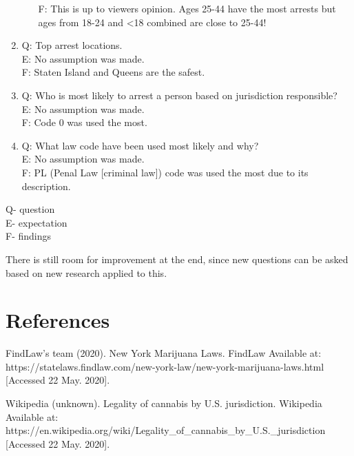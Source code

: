 \documentclass{article}\usepackage[]{graphicx}\usepackage[]{color}
\begin{document}
\begin{enumerate}
\begin{enumerate}
              F: This is up to viewers opinion. Ages 25-44 have the most arrests but ages from 18-24 and                <18 combined are close to 25-44! 
          \end{enumerate}
        \item
          Q:  Top arrest locations.\\
          E: No assumption was made.\\
          F: Staten Island and Queens are the safest.
        \item
          Q: Who is most likely to arrest a person based on jurisdiction responsible?\\
          E: No assumption was made.\\
          F: Code 0 was used the most.
        \item
          Q: What law code have been used most likely and why?\\
          E: No assumption was made.\\
          F: PL (Penal Law [criminal law]) code was used the most due to its description.
      \end{enumerate}
      
      
      \noindent Q- question\\
      E- expectation\\
      F- findings \vspace{5mm}

      There is still room for improvement at the end, since new questions can be asked based on new research applied to this.

  \maketitle
    \newpage
      \section{References}
        FindLaw's team (2020). New York Marijuana Laws. FindLaw
        Available at:
        https://statelaws.findlaw.com/new-york-law/new-york-marijuana-laws.html
        [Accessed 22 May. 2020].\vspace{5mm}

        Wikipedia (unknown). Legality of cannabis by U.S. jurisdiction. Wikipedia
        Available at:
        https://en.wikipedia.org/wiki/Legality\_of\_cannabis\_by\_U.S.\_jurisdiction
        [Accessed 22 May. 2020].\vspace{5mm}
\end{document}
